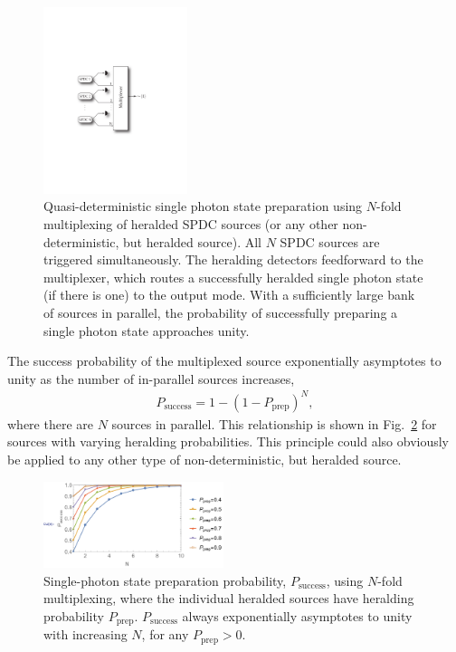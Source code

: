 \begin{figure}[!htb]
\includegraphics[width=0.375\textwidth]{SPDC_multiplexing_arch}
\caption{Quasi-deterministic single photon state preparation using $N$-fold multiplexing of heralded SPDC sources (or any other non-deterministic, but heralded source). All $N$ SPDC sources are triggered simultaneously. The heralding detectors feedforward to the multiplexer, which routes a successfully heralded single photon state (if there is one) to the output mode. With a sufficiently large bank of sources in parallel, the probability of successfully preparing a single photon state approaches unity.} \label{fig:SPDC_multiplexing_arch}
\end{figure}

The success probability of the multiplexed source exponentially asymptotes to unity as the number of in-parallel sources increases,
\begin{align} \label{eq:SPDC_multiplex}
P_\text{success} = 1 - (1-P_\text{prep})^N,
\end{align}
where there are $N$ sources in parallel. This relationship is shown in Fig.~\ref{fig:SPDC_multiplexing_plot} for sources with varying heralding probabilities. This principle could also obviously be applied to any other type of non-deterministic, but heralded source.

\begin{figure}[!htb]
\includegraphics[width=0.47\textwidth]{SPDC_multiplexing_plot}
\caption{Single-photon state preparation probability, $P_\text{success}$, using $N$-fold multiplexing, where the individual heralded sources have heralding probability $P_\text{prep}$. $P_\text{success}$ always exponentially asymptotes to unity with increasing $N$, for any \mbox{$P_\text{prep}>0$}.} \label{fig:SPDC_multiplexing_plot}
\end{figure}

